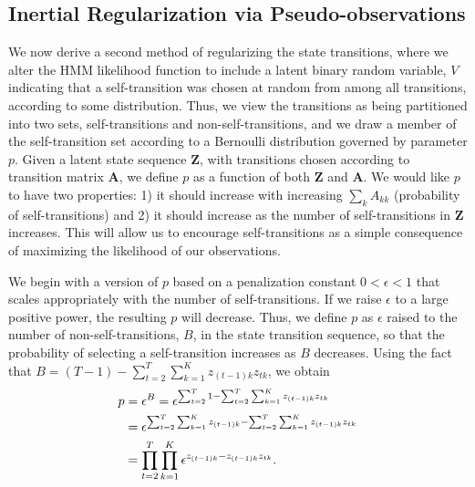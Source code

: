 \documentclass[letterpaper]{article}
\begin{document}
\subsection{Inertial Regularization via Pseudo-observations}

We now derive a second method of regularizing the state transitions, where we
alter the HMM likelihood function to include a latent binary random variable,
$V$ indicating that a self-transition was chosen at random from among all
transitions, according to some distribution. 
Thus, we view the transitions as
being partitioned into two sets, self-transitions and non-self-transitions, and
we draw a member of the self-transition set according to a Bernoulli
distribution governed by parameter $p$. Given a latent state sequence
$\mathbf{Z}$, with transitions chosen according to transition matrix
$\mathbf{A}$, we define $p$ as a function of both $\mathbf{Z}$ and $\mathbf{A}$.
We would like $p$ to have two properties: 1) it should increase with increasing
$\sum_k A_{kk}$ (probability of self-transitions) and 2) it should increase as
the number of self-transitions in $\mathbf{Z}$ increases. This will allow us to
encourage self-transitions as a simple consequence of maximizing the likelihood
of our observations.

We begin with a version of $p$ based on a penalization constant $0 < \epsilon <
1$ that scales appropriately with the number of self-transitions. If we raise
$\epsilon$ to a large positive power, the resulting $p$ will decrease. Thus, we
define $p$ as $\epsilon$ raised to the number of non-self-transitions, $B$, in
the state transition sequence, so that the probability of selecting a
self-transition increases as $B$ decreases. Using
the fact that $B=(T-1) -
\sum^{T}_{t=2}\sum^{K}_{k=1}z_{(t-1)k}z_{tk}$, we obtain
\begin{align}
    p &= \epsilon^B = \epsilon^{\sum^{T}_{t=2}1 -
    \sum^{T}_{t=2}\sum^{K}_{k=1}z_{(t-1)k}z_{tk}} \notag\\
      &= \epsilon^{\sum^{T}_{t=2}\sum^{K}_{k=1}z_{(t-1)k} - \sum^{T}_{t=2}\sum^{K}_{k=1}z_{(t-1)k}z_{tk}} \notag\\
      &= \prod^{T}_{t=2}\prod_{k=1}^{K}\epsilon^{z_{(t-1)k} - z_{(t-1)k}z_{tk}}. \label{eq:eps-0}
\end{align}
\end{document}
